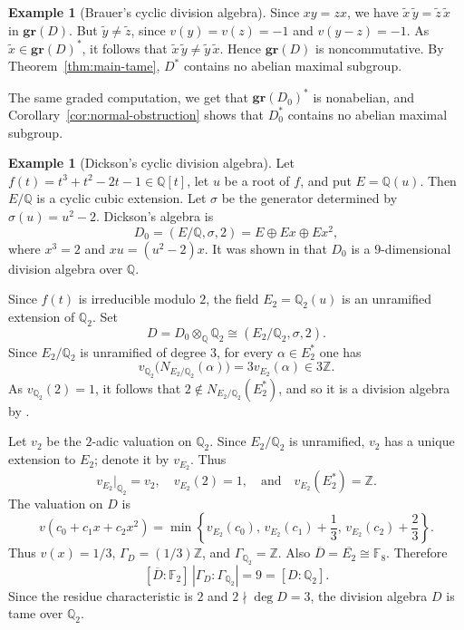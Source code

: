 \documentclass[11pt]{amsart}
\theoremstyle{definition}
\newtheorem{example}[theorem]{Example}
\begin{document}
\begin{example}[Brauer's cyclic division algebra]
Since $xy=zx$, we have $\widetilde x\,\widetilde y=\widetilde z\,\widetilde x$ in $\mathbf{gr}(D)$.  But $\widetilde y\ne\widetilde z$, since $v(y)=v(z)=-1$ and $v(y-z)=-1$.  As $\widetilde x \in \mathbf{gr}(D)^*$, it follows that $\widetilde x\,\widetilde y\ne\widetilde y\,\widetilde x$.  Hence $\mathbf{gr}(D)$ is noncommutative.  By Theorem~\ref{thm:main-tame}, $D^*$ contains no abelian maximal subgroup.

The same graded computation, we get that $\mathbf{gr}(D_0)^*$ is nonabelian, and Corollary~\ref{cor:normal-obstruction} shows that $D_0^*$ contains no abelian maximal subgroup.
\end{example}

\begin{example}[Dickson's cyclic division algebra]
\label{ex:dickson-cyclic}
Let $f(t)=t^3+t^2-2t-1\in\mathbb Q[t]$, let $u$ be a root of $f$, and put $E=\mathbb Q(u)$.  Then $E/\mathbb Q$ is a cyclic cubic extension.  Let $\sigma$ be the generator determined by $\sigma(u)=u^2-2$.  Dickson's algebra is
\[
        D_0=(E/\mathbb Q,\sigma,2)=E\oplus Ex\oplus Ex^2,
\]
where $x^3=2$ and $xu=(u^2-2)x$.  It was shown in \cite[p.~227]{L} that $D_0$ is a $9$-dimensional division algebra over $\mathbb Q$.

Since $f(t)$ is irreducible modulo $2$, the field $E_2=\mathbb Q_2(u)$ is an unramified extension of $\mathbb Q_2$.  Set
\[
        D=D_0\otimes_{\mathbb Q}\mathbb Q_2
        \cong
        (E_2/\mathbb Q_2,\sigma,2).
\]
Since $E_2/\mathbb Q_2$ is unramified of degree $3$, for every
$\alpha\in E_2^*$ one has
\[
        v_{\mathbb Q_2}\bigl(N_{E_2/\mathbb Q_2}(\alpha)\bigr)
        =
        3v_{E_2}(\alpha)\in 3\mathbb Z.
\]
As $v_{\mathbb Q_2}(2)=1$, it follows that $2\notin N_{E_2/\mathbb Q_2}(E_2^*)$, and so it is a division algebra by \cite[Corollary 14.8]{L}.

Let $v_2$ be the $2$-adic valuation on $\mathbb Q_2$. Since $E_2/\mathbb Q_2$ is unramified, $v_2$ has a unique extension to $E_2$; denote it by $v_{E_2}$. Thus
\[
        v_{E_2}|_{\mathbb Q_2}=v_2,
        \quad
        v_{E_2}(2)=1,
        \quad\text{and}\quad
        v_{E_2}(E_2^*)=\mathbb Z.
\]
The valuation on $D$ is
\[
        v\left(c_0+c_1x+c_2x^2\right)
        =
        \min\left\{
        v_{E_2}(c_0),\,
        v_{E_2}(c_1)+\frac13,\,
        v_{E_2}(c_2)+\frac23
        \right\}.
\]
Thus $v(x)=1/3$, $\Gamma_D=(1/3)\mathbb Z$, and $\Gamma_{\mathbb Q_2}=\mathbb Z$.  Also $\overline D=\overline{E_2}\cong\mathbb F_8$.  Therefore
\[
        [\overline D:\mathbb F_2]\,|\Gamma_D:\Gamma_{\mathbb Q_2}|
        =
        9
        =
        [D:\mathbb Q_2].
\]
Since the residue characteristic is $2$ and $2\nmid \deg D=3$, the division algebra $D$ is tame over $\mathbb Q_2$.


\end{example}
\end{document}
